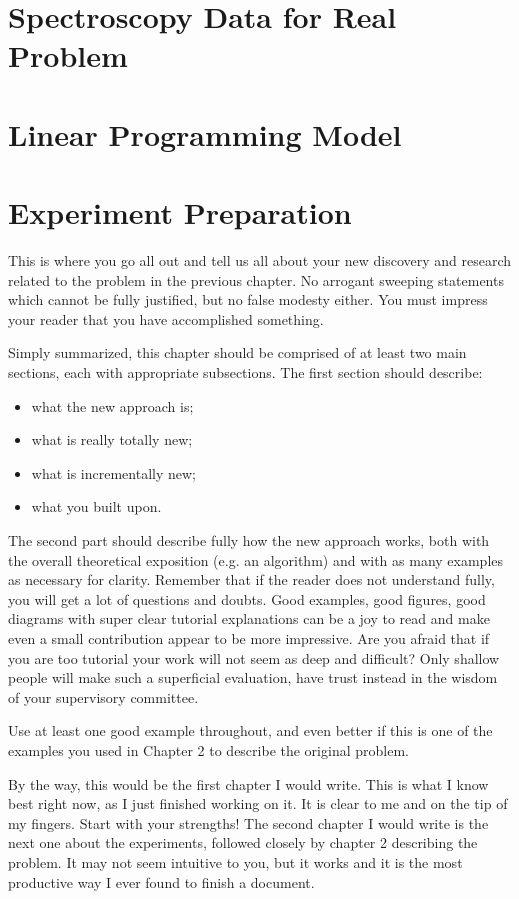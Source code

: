 \label{chapter:realproblem}

\section{Spectroscopy Data for Real Problem}
\section{Linear Programming Model}
\section{Experiment Preparation}
This is where you go all out and tell us all about your new discovery and research related to the problem in the previous chapter. No arrogant sweeping statements which cannot be fully justified, but no false modesty either. You must impress your reader that you have accomplished something.

Simply summarized, this chapter should be comprised of at least two main sections, each with appropriate subsections. The first section should describe:
\begin{itemize}
\item {what the new approach is;}
\item {what is really totally new;}
\item {what is incrementally new;}
\item {what you built upon.}
\end{itemize}

The second part should describe fully how the new approach works, both with the overall theoretical exposition (e.g. an algorithm) and with as many examples as necessary for clarity. Remember that if the reader does not understand fully, you will get a lot of questions and doubts. Good examples, good figures, good diagrams with super clear tutorial explanations can be a joy to read and make even a small contribution appear to be more impressive. Are you afraid that if you are too tutorial your work will not seem as deep and difficult? Only shallow people will make such a superficial evaluation, have trust instead in the wisdom of your supervisory committee.

Use at least one good example throughout, and even better if this is one of the examples you used in Chapter 2 to describe the original problem.

By the way, this would be the first chapter I would write. This is what I know best right now, as I just finished working on it. It is clear to me and on the tip of my fingers. Start with your strengths! The second chapter I would write is the next one about the experiments, followed closely by chapter 2 describing the problem. It may not seem intuitive to you, but it works and it is the most productive way I ever found to finish a document.



